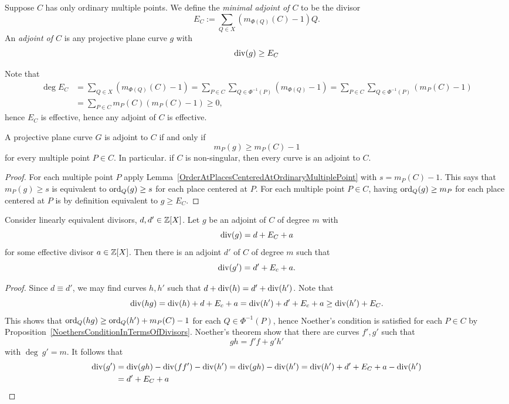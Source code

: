     \begin{definition}
        Suppose $C$ has only ordinary multiple points. We define the \emph{minimal adjoint of $C$} to be the divisor
        $$
            E_C := \sum_{Q\in X} (m_{\Phi(Q)}(C)-1)Q.
        $$
        An \emph{adjoint of $C$} is any projective plane curve $g$ with 
        $$
            \mathrm{div}(g) \geq E_C
        $$ 
    \end{definition}
    \begin{remark}
        Note that 
        \begin{align*}
            \deg E_C &= \sum_{Q\in X} (m_{\Phi(Q)}(C)-1) = \sum_{P\in C}\sum_{Q\in \Phi^{-1}(P)} (m_{\Phi(Q)}-1)= \sum_{P\in C} \sum_{Q\in \Phi^{-1}(P)} (m_{P}(C)-1)\\ 
            &= \sum_{P\in C} m_{P}(C)(m_P(C)-1) \geq 0,
        \end{align*}
        hence $E_C$ is effective, hence any adjoint of $C$ is effective. 
    \end{remark}
    \begin{lemma}
        A projective plane curve $G$ is adjoint to $C$ if and only if 
        $$
            m_P(g) \geq m_P(C)-1
        $$ 
        for every multiple point $P\in C$. In particular. if $C$ is non-singular, then every curve is an adjoint to $C$.
    \end{lemma}
    \begin{proof}
        For each multiple point $P$ apply Lemma~\ref{OrderAtPlacesCenteredAtOrdinaryMultiplePoint} with $s = m_P(C)-1$. This says that $m_P(g) \geq s$ is equivalent to $\mathrm{ord}_{Q}(g)\geq s$ for each place centered at $P$. For each multiple point $P\in C$, having $\mathrm{ord}_Q(g)\geq m_{P}$ for each place centered at $P$ is by definition equivalent to $g\geq E_C$. 
    \end{proof}
    \begin{theorem}
        Consider linearly equivalent divisors, $d,d'\in \mathbb{Z}[X]$. Let $g$ be an adjoint of $C$ of degree $m$ with
        $$
            \mathrm{div}(g) = d + E_C+a
        $$ 
        for some effective divisor $a\in \mathbb{Z}[X]$. Then there is an adjoint $d'$ of $C$ of degree $m$ such that 
        $$
            \mathrm{div}(g') = d'+E_c+a.
        $$
    \end{theorem}
    \begin{proof}
        Since $d\equiv d'$, we may find curves $h,h'$ such that $d+\mathrm{div}(h) = d' + \mathrm{div}(h')$. Note that 
        $$
            \mathrm{div}(hg) = \mathrm{div}(h)+d + E_c +a =\mathrm{div}(h')+d' + E_c+a\geq \mathrm{div}(h')+ E_C.
        $$
        This shows that $\mathrm{ord}_{Q}(hg)\geq \mathrm{ord}_Q(h')+m_P(C)-1$ for each $Q\in \Phi^{-1}(P)$, hence Noether's condition is satisfied for each $P\in C$ by Proposition~\ref{NoethersConditionInTermsOfDivisors}. Noether's theorem show that there are curves $f',g'$ such that 
        $$
            gh = f'f + g'h'
        $$
        with $\deg \ g' = m$. It follows that 
        \begin{align*}
            \mathrm{div}(g') &= \mathrm{div}(gh)-\mathrm{div}(ff')-\mathrm{div}(h') = \mathrm{div}(gh)-\mathrm{div}(h')= \mathrm{div}(h')+d'+E_C+a-\mathrm{div}(h')\\ 
            &= d'+E_C+a
        \end{align*}
    \end{proof}
